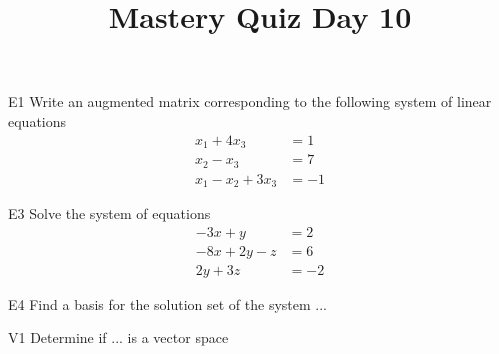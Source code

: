 \documentclass{sbgLAquiz}
\title{Mastery Quiz Day 10 }
\begin{document}
\begin{problem}{E1}
Write an augmented matrix corresponding to the following system of linear equations
\begin{align*}
x_1+4x_3 &= 1 \\
x_2-x_3 &= 7 \\
x_1-x_2+3x_3 &= -1
\end{align*}
\end{problem}

\begin{problem}{E3}
Solve the system of equations
\begin{align*}
-3x +y &= 2\\
-8x+2y-z &= 6 \\
2y+3z &= -2
\end{align*}


\end{problem}
\newpage

\begin{problem}{E4}
Find a basis for the solution set of the system ...
\end{problem}

\begin{problem}{V1}
Determine if ... is a vector space
\end{problem}
\end{document}
